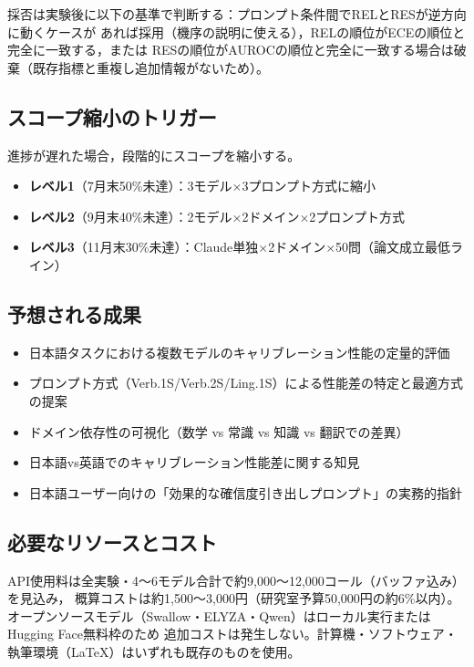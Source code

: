 \documentclass[11pt,a4paper,oneside]{article}
\begin{document}
採否は実験後に以下の基準で判断する：プロンプト条件間でRELとRESが逆方向に動くケースが
あれば採用（機序の説明に使える），RELの順位がECEの順位と完全に一致する，または
RESの順位がAUROCの順位と完全に一致する場合は破棄（既存指標と重複し追加情報がないため）。

\subsection{スコープ縮小のトリガー}

進捗が遅れた場合，段階的にスコープを縮小する。
\begin{itemize}
  \item \textbf{レベル1}（7月末50\%未達）：3モデル×3プロンプト方式に縮小
  \item \textbf{レベル2}（9月末40\%未達）：2モデル×2ドメイン×2プロンプト方式
  \item \textbf{レベル3}（11月末30\%未達）：Claude単独×2ドメイン×50問（論文成立最低ライン）
\end{itemize}

\subsection{予想される成果}

\begin{itemize}
  \item 日本語タスクにおける複数モデルのキャリブレーション性能の定量的評価
  \item プロンプト方式（Verb.1S/Verb.2S/Ling.1S）による性能差の特定と最適方式の提案
  \item ドメイン依存性の可視化（数学 vs 常識 vs 知識 vs 翻訳での差異）
  \item 日本語vs英語でのキャリブレーション性能差に関する知見
  \item 日本語ユーザー向けの「効果的な確信度引き出しプロンプト」の実務的指針
\end{itemize}

\subsection{必要なリソースとコスト}

API使用料は全実験・4〜6モデル合計で約9,000〜12,000コール（バッファ込み）を見込み，
概算コストは約1,500〜3,000円（研究室予算50,000円の約6\%以内）。
オープンソースモデル（Swallow・ELYZA・Qwen）はローカル実行またはHugging Face無料枠のため
追加コストは発生しない。計算機・ソフトウェア・執筆環境（LaTeX）はいずれも既存のものを使用。
\end{document}
